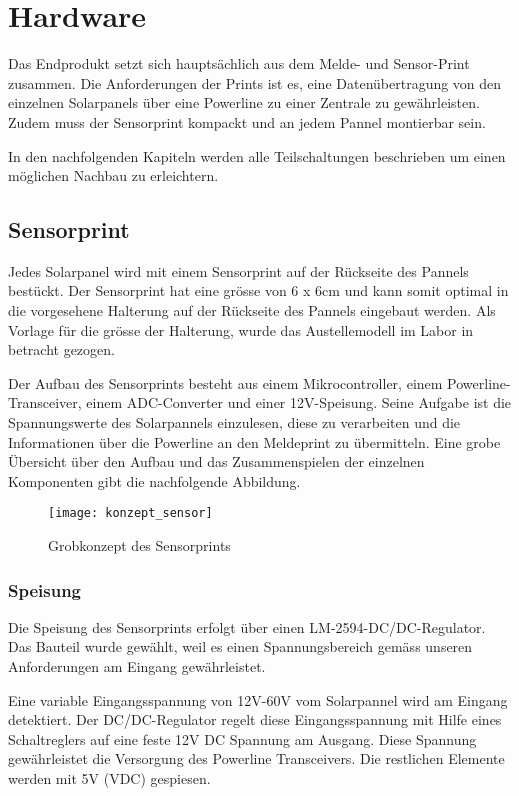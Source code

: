 \section{Hardware}
Das Endprodukt setzt sich hauptsächlich aus dem Melde- und Sensor-Print zusammen. Die Anforderungen der Prints ist es, eine Datenübertragung von den einzelnen Solarpanels über eine Powerline zu einer Zentrale zu gewährleisten. Zudem muss der Sensorprint kompackt und an jedem Pannel montierbar sein.

In den nachfolgenden Kapiteln werden alle Teilschaltungen beschrieben um einen möglichen Nachbau zu erleichtern.

\subsection{Sensorprint}


Jedes Solarpanel wird mit einem Sensorprint auf der Rückseite des Pannels bestückt. Der Sensorprint hat eine grösse von 6 x 6cm und kann somit optimal in die vorgesehene Halterung auf der Rückseite des Pannels eingebaut werden. Als Vorlage für die grösse der Halterung, wurde das Austellemodell im Labor in betracht gezogen.

Der Aufbau des Sensorprints besteht aus einem Mikrocontroller, einem Powerline-Transceiver, einem ADC-Converter und einer 12V-Speisung. Seine Aufgabe ist die Spannungswerte des Solarpannels einzulesen, diese zu verarbeiten und die Informationen über die Powerline an den Meldeprint zu übermitteln. Eine grobe Übersicht über den Aufbau und das Zusammenspielen der einzelnen Komponenten gibt die nachfolgende Abbildung.

\begin{figure}[h]
\centering
\texttt{[image: konzept\_sensor]}
\caption{Grobkonzept des Sensorprints}
\end{figure}

\subsubsection{Speisung}
Die Speisung des Sensorprints erfolgt über einen LM-2594-DC/DC-Regulator. Das Bauteil wurde gewählt, weil es einen Spannungsbereich gemäss unseren Anforderungen am Eingang gewährleistet.

Eine variable Eingangsspannung von 12V-60V vom Solarpannel wird am Eingang detektiert. Der DC/DC-Regulator regelt diese Eingangsspannung mit Hilfe eines Schaltreglers auf eine feste 12V DC Spannung am Ausgang. Diese Spannung gewährleistet die Versorgung des Powerline Transceivers. Die restlichen Elemente werden mit 5V (VDC) gespiesen.

